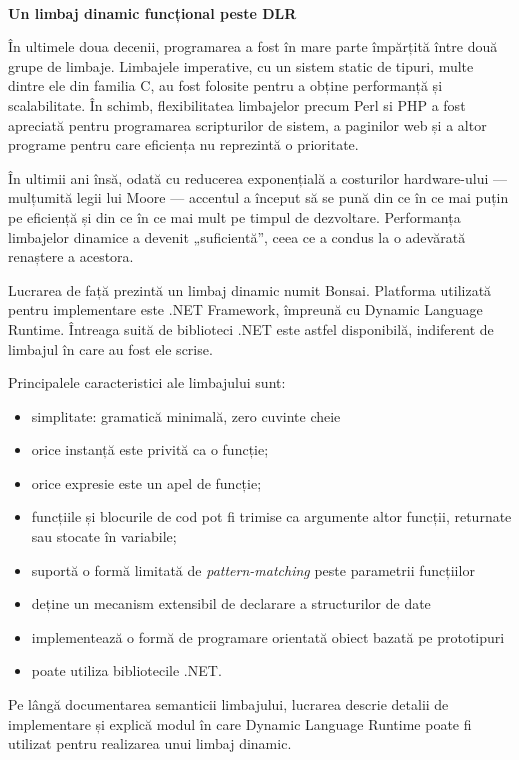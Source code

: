 \documentclass[12pt,a4paper]{memoir}
\begin{document}
\thispagestyle{empty}
\begin{centering}
\textbf{\\\Large{Un limbaj dinamic funcțional peste DLR}}
\\[1.5cm]
\end{centering}
În ultimele doua decenii, programarea a fost în mare parte împărțită între două grupe de limbaje. Limbajele imperative, cu un sistem static de tipuri, multe dintre ele din familia C, au fost folosite pentru a obține performanță și scalabilitate. În schimb, flexibilitatea limbajelor precum Perl si PHP a fost apreciată pentru programarea scripturilor de sistem, a paginilor web și a altor programe pentru care eficiența nu reprezintă o prioritate.

În ultimii ani însă, odată cu reducerea exponențială a costurilor hardware-ului — mulțumită legii lui Moore — accentul a început să se pună din ce în ce mai puțin pe eficiență și din ce în ce mai mult pe timpul de dezvoltare. Performanța limbajelor dinamice a devenit „suficientă”, ceea ce a condus la o adevărată renaștere a acestora.

Lucrarea de față prezintă un limbaj dinamic numit Bonsai. Platforma utilizată pentru implementare este .NET Framework, împreună cu Dynamic Language Runtime. Întreaga suită de biblioteci .NET este astfel disponibilă, indiferent de limbajul în care au fost ele scrise.

Principalele caracteristici ale limbajului sunt:
\begin{itemize}
\item simplitate: gramatică minimală, zero cuvinte cheie
\item orice instanță este privită ca o funcție;
\item orice expresie este un apel de funcție;
\item funcțiile și blocurile de cod pot fi trimise ca argumente altor funcții, returnate sau stocate în variabile;
\item suportă o formă limitată de \emph{pattern-matching} peste parametrii funcțiilor
\item deține un mecanism extensibil de declarare a structurilor de date 
\item implementează o formă de programare orientată obiect bazată pe prototipuri
\item poate utiliza bibliotecile .NET.
\end{itemize}

Pe lângă documentarea semanticii limbajului, lucrarea descrie detalii de implementare și explică modul în care Dynamic Language Runtime poate fi utilizat pentru realizarea unui limbaj dinamic.
\end{document}
